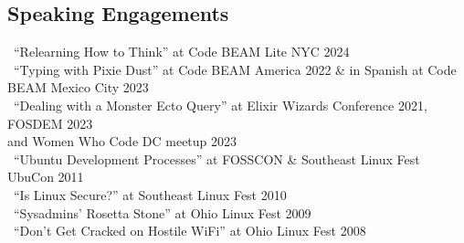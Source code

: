 \documentclass[headline, letterpaper]{res}
\begin{document}
\begin{resume}
	\section{Speaking Engagements}
	        \textbullet \ ``Relearning How to Think'' at Code BEAM Lite NYC 2024\\
			\textbullet \ ``Typing with Pixie Dust'' at Code BEAM America 2022 \& in Spanish at Code BEAM Mexico City 2023\\
			\textbullet \ ``Dealing with a Monster Ecto Query'' at Elixir Wizards Conference 2021, FOSDEM 2023\\     
			\hspace*{0.25in}and Women Who Code DC meetup 2023\\
			\textbullet \ ``Ubuntu Development Processes'' at FOSSCON \& Southeast Linux Fest UbuCon 2011\\
			\textbullet \ ``Is Linux Secure?'' at Southeast Linux Fest 2010\\
			\textbullet \ ``Sysadmins' Rosetta Stone'' at Ohio Linux Fest 2009\\
			\textbullet \ ``Don't Get Cracked on Hostile WiFi'' at Ohio Linux Fest 2008\\

			
			
			
			


\end{resume}
\end{document}

